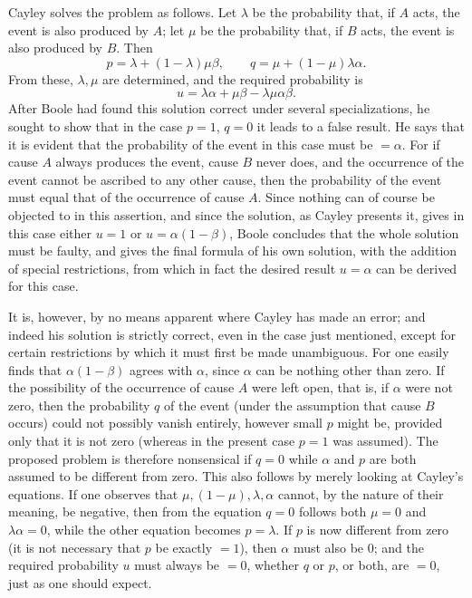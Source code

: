 \documentclass[11pt]{article}
\begin{document}
Cayley solves the problem as follows. Let $\lambda$ be the probability that, if $A$ acts, the event is also produced by $A$; let $\mu$ be the probability that, if $B$ acts, the event is also produced by $B$. Then
\[
p=\lambda+(1-\lambda)\mu\beta,
\qquad
q=\mu+(1-\mu)\lambda\alpha.
\]
From these, $\lambda,\mu$ are determined, and the required probability is
\[
u=\lambda\alpha+\mu\beta-\lambda\mu\alpha\beta.
\]
After Boole had found this solution correct under several specializations, he sought to show that in the case $p=1$, $q=0$ it leads to a false result. He says that it is evident that the probability of the event in this case must be $=\alpha$. For if cause $A$ always produces the event, cause $B$ never does, and the occurrence of the event cannot be ascribed to any other cause, then the probability of the event must equal that of the occurrence of cause $A$. Since nothing can of course be objected to in this assertion, and since the solution, as Cayley presents it, gives in this case either $u=1$ or $u=\alpha(1-\beta)$, Boole concludes that the whole solution must be faulty, and gives the final formula of his own solution, with the addition of special restrictions, from which in fact the desired result $u=\alpha$ can be derived for this case.

It is, however, by no means apparent where Cayley has made an error; and indeed his solution is strictly correct, even in the case just mentioned, except for certain restrictions by which it must first be made unambiguous. For one easily finds that $\alpha(1-\beta)$ agrees with $\alpha$, since $\alpha$ can be nothing other than zero. If the possibility of the occurrence of cause $A$ were left open, that is, if $\alpha$ were not zero, then the probability $q$ of the event (under the assumption that cause $B$ occurs) could not possibly vanish entirely, however small $p$ might be, provided only that it is not zero (whereas in the present case $p=1$ was assumed). The proposed problem is therefore nonsensical if $q=0$ while $\alpha$ and $p$ are both assumed to be different from zero. This also follows by merely looking at Cayley's equations. If one observes that $\mu,(1-\mu),\lambda,\alpha$ cannot, by the nature of their meaning, be negative, then from the equation $q=0$ follows both $\mu=0$ and $\lambda\alpha=0$, while the other equation becomes $p=\lambda$. If $p$ is now different from zero (it is not necessary that $p$ be exactly $=1$), then $\alpha$ must also be $0$; and the required probability $u$ must always be $=0$, whether $q$ or $p$, or both, are $=0$, just as one should expect.
\end{document}
